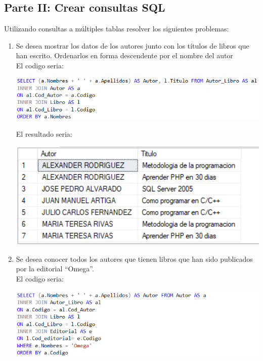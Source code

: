 \documentclass[12pt,letterpaper]{article}
\newcommand\tab[1][1cm]{\hspace*{#1}}
\begin{document}
    \subsection{Parte II: Crear consultas SQL}
    Utilizando consultas a múltiples tablas resolver los siguientes problemas:
    \begin{enumerate}[\tab 1.]
        \item Se desea mostrar los datos de los autores junto con los títulos de libros que han escrito. Ordenarlos en forma descendente por el nombre del autor\\[0.1in]
        El codigo seria:
        \begin{center}
            \includegraphics[width=13cm]{./img/img7.1.png}
        \end{center}
        El resultado seria:
        \begin{center}
            \includegraphics[width=13cm]{./img/img7.2.png}
        \end{center}
        \item Se desea conocer todos los autores que tienen libros que han sido publicados por la editorial “Omega”.\\[0.1in]
        El codigo seria:
        \begin{center}
            \includegraphics[width=13cm]{./img/img8.1.png}
        \end{center}

\end{enumerate}
\end{document}
